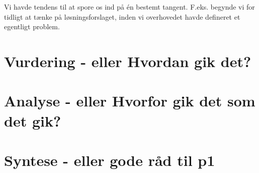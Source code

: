 Vi havde tendens til at spore os ind på én bestemt tangent. F.eks. begynde vi for tidligt at tænke på løsningsforslaget, inden vi overhovedet havde defineret et egentligt problem.



\section{Vurdering - eller Hvordan gik det?}



\section{Analyse - eller Hvorfor gik det som det gik?}



\section{Syntese - eller gode råd til p1}








